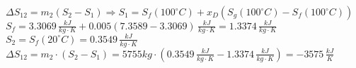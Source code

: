 \( \Delta S_{12} = m_2 (S_2 - S_1) \Rightarrow S_1 = S_f (100^\circ C) + x_D (S_g (100^\circ C) - S_f (100^\circ C)) \)  
\( S_f = 3.3069 \, \frac{kJ}{kg \cdot K} + 0.005 (7.3589 - 3.3069) \, \frac{kJ}{kg \cdot K} = 1.3374 \, \frac{kJ}{kg \cdot K} \)  
\( S_2 = S_f (20^\circ C) = 0.3549 \, \frac{kJ}{kg \cdot K} \)  
\( \Delta S_{12} = m_2 \cdot (S_2 - S_1) = 5755kg \cdot (0.3549 \, \frac{kJ}{kg \cdot K} - 1.3374 \, \frac{kJ}{kg \cdot K}) = -3575 \, \frac{kJ}{K} \)